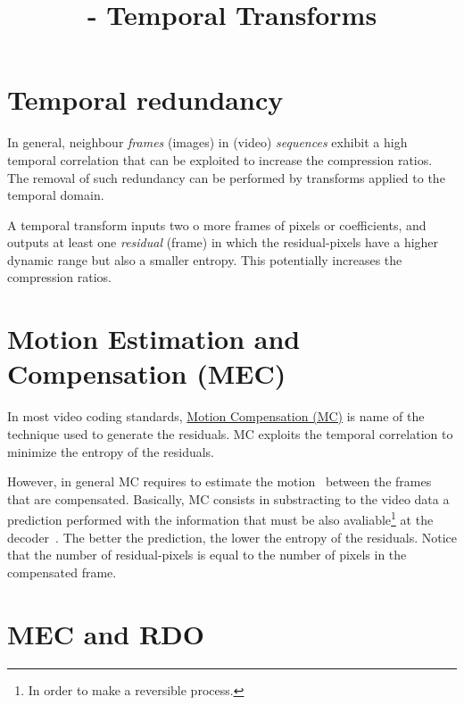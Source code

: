 

\title{\SM{} - Temporal Transforms}

\maketitle

\section{Temporal redundancy}

In general, neighbour \emph{frames} (images) in (video)
\emph{sequences} exhibit a high temporal correlation that can be
exploited to increase the compression ratios. The removal of such
redundancy can be performed by transforms applied to the temporal
domain.

A temporal transform inputs two o more frames of pixels or
coefficients, and outputs at least one \emph{residual} (frame) in
which the residual-pixels have a higher dynamic range but also a
smaller entropy. This potentially increases the compression ratios.


\section{Motion Estimation and Compensation (MEC)}

In most video coding standards,
\href{https://en.wikipedia.org/wiki/Motion_compensation}{Motion
  Compensation (MC)} is name of the technique used to generate the
residuals. MC exploits the temporal correlation to minimize the
entropy of the residuals.

However, in general MC requires to estimate the
motion~\cite{vruiz__ME} between the frames that are
compensated. Basically, MC consists in substracting to the video data
a prediction performed with the information that must be also
avaliable\footnote{In order to make a reversible process.} at the
decoder~\cite{vruiz__MCT}. The better the prediction, the lower the
entropy of the residuals. Notice that the number of residual-pixels is
equal to the number of pixels in the compensated frame.


\section{MEC and RDO}

